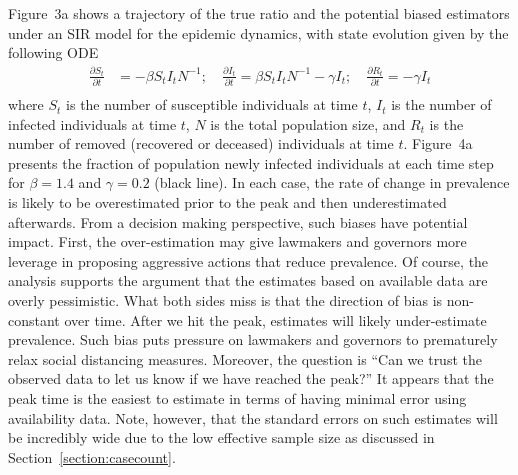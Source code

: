 \documentclass[12pt]{article}
\begin{document}
Figure~3a shows a trajectory of the true ratio and the potential biased estimators under an SIR model for the epidemic dynamics, with state evolution given by the following ODE
$$
\begin{aligned}
\frac{\partial S_t}{\partial t} &= - \beta S_t I_t N^{-1}; \quad
\frac{\partial I_t}{\partial t} = \beta S_t I_t N^{-1} - \gamma I_t; \quad
\frac{\partial R_t}{\partial t} = - \gamma I_t \\
\end{aligned}
$$
where $S_t$ is the number of susceptible individuals at time $t$, $I_t$ is the number of infected individuals at time $t$, $N$ is the total population size, and $R_t$ is the number of removed (recovered or deceased) individuals at time $t$.   Figure~4a presents the fraction of population newly infected individuals at each time step for $\beta = 1.4$ and $\gamma = 0.2$ (black line).  In each case, the rate of change in prevalence is likely to be  overestimated prior to the peak and then underestimated afterwards.  From a decision making perspective, such biases have potential impact.  First, the over-estimation may give lawmakers and governors more leverage in proposing aggressive actions that reduce prevalence.  Of course, the analysis supports the argument that the estimates based on available data are overly pessimistic. What both sides miss is that the direction of bias is non-constant over time.  After we hit the peak, estimates will likely under-estimate prevalence.  Such bias puts pressure on lawmakers and governors to prematurely relax social distancing measures.  Moreover, the question is ``Can we trust the observed data to let us know if we have reached the peak?''  It appears that the peak time is the easiest to estimate in terms of having minimal error using availability data.  Note, however, that the standard errors on such estimates will be incredibly wide due to the low effective sample size as discussed in Section~\ref{section:casecount}.
\end{document}

